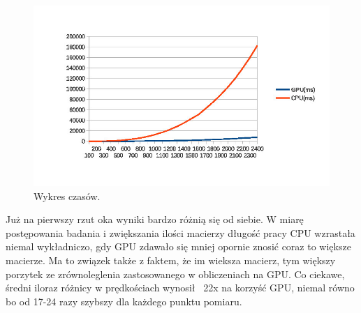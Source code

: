 \documentclass[a4paper,12pt,oneside]{article}
\begin{document}
\begin{figure}[H]
  \caption{Wykres czasów.}
  \centering
    \includegraphics[width=1.2\textwidth]{wykres}
\end{figure}

Już na pierwszy rzut oka wyniki bardzo różnią się od siebie. W miarę postępowania badania i zwiększania ilości macierzy długość pracy CPU wzrastała niemal wykładniczo, gdy GPU zdawało się mniej opornie znosić coraz to większe macierze. Ma to związek także z faktem, że im wieksza macierz, tym większy porzytek ze zrównoleglenia zastosowanego w obliczeniach na GPU. Co ciekawe, średni iloraz różnicy w  prędkościach wynosił ~22x na korzyść GPU, niemal równo bo od 17-24 razy szybszy dla każdego punktu pomiaru.
\end{document}
